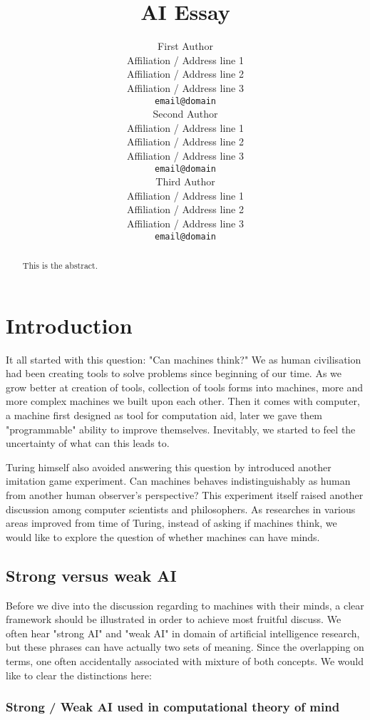 \documentclass[11pt]{article}
\title{AI Essay}
\author{First Author \\
  Affiliation / Address line 1 \\
  Affiliation / Address line 2 \\
  Affiliation / Address line 3 \\
  {\tt email@domain} \\\And
  Second Author \\
  Affiliation / Address line 1 \\
  Affiliation / Address line 2 \\
  Affiliation / Address line 3 \\
  {\tt email@domain} \\\And
  Third Author \\
  Affiliation / Address line 1 \\
  Affiliation / Address line 2 \\
  Affiliation / Address line 3 \\
  {\tt email@domain} \\}
\date{}
\begin{document}
\maketitle
\begin{abstract}
This is the abstract.
\end{abstract}

\section{Introduction}
\label{sec:introduction}

It all started with this question: "Can machines think?" We as human civilisation had been creating tools to solve problems since beginning of our time. As we grow better at creation of tools, collection of tools forms into machines, more and more complex machines we built upon each other. Then it comes with computer, a machine first designed as tool for computation aid, later we gave them "programmable" ability to improve themselves. Inevitably, we started to feel the uncertainty of what can this leads to.

Turing himself also avoided answering this question by introduced another imitation game experiment. Can machines behaves indistinguishably as human from another human observer's perspective? This experiment itself raised another discussion among computer scientists and philosophers. As researches in various areas improved from time of Turing, instead of asking if machines think, we would like to explore the question of whether machines can have minds.

\subsection{Strong versus weak AI}

Before we dive into the discussion regarding to machines with their minds, a clear framework should be illustrated in order to achieve most fruitful discuss. We often hear "strong AI" and "weak AI" in domain of artificial intelligence research, but these phrases can have actually two sets of meaning. Since the overlapping on terms, one often accidentally associated with mixture of both concepts. We would like to clear the distinctions here: 

\subsubsection{Strong / Weak AI used in computational theory of mind}
\end{document}
